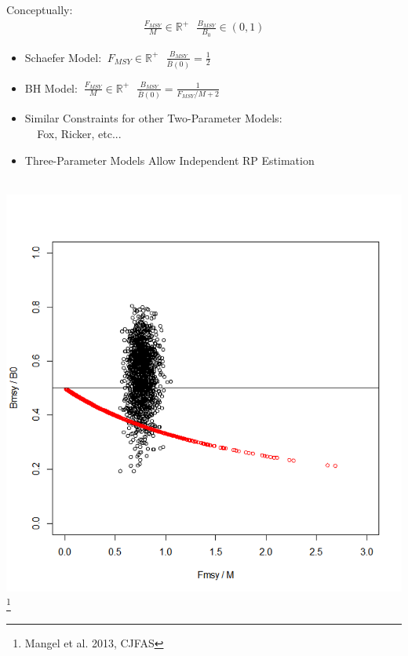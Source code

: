 \documentclass[ xcolor = pdftex, dvipsnames, table ]{beamer}
\begin{document}
%
\begin{frame}
\begin{minipage}[h!]{0.59\textwidth}
Conceptually:
\begin{align*}
\frac{F_{MSY}}{M}\in\mathbb{R}^+ ~~~ \frac{B_{MSY}}{B_{0}}\in\left(0, 1\right)
\end{align*}
\vspace{-0.5cm}
\begin{itemize}
	\setlength{\itemsep}{2mm}
	\item Schaefer Model: $~ F_{MSY}\in\mathbb{R}^+ ~~~ \frac{B_{MSY}}{\bar B(0)}=\frac{1}{2}$
        \item BH Model: $~ \frac{F_{MSY}}{M}\in\mathbb{R}^+ ~~~ \frac{B_{MSY}}{\bar B(0)}=\frac{1}{F_{MSY}/M+2}$
        \item Similar Constraints for other Two-Parameter Models: \\$~~~~~$Fox, Ricker, etc...
        \item Three-Parameter Models Allow Independent RP Estimation %
\end{itemize}
\end{minipage}
\begin{minipage}[h!]{0.39\textwidth}
$~$\\
\hspace*{-0.5cm}
\includegraphics[width=1.3\textwidth]{cjasFig.png}\footnote{\scriptsize Mangel et al. 2013, CJFAS}
\end{minipage}
\end{frame}
\end{document}
